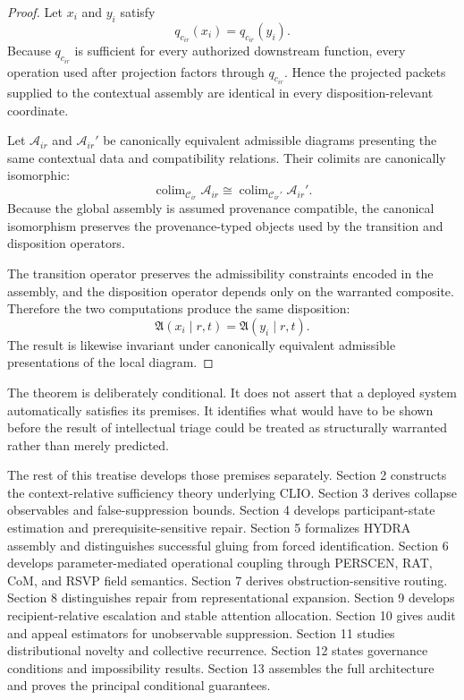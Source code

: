 \documentclass[11pt]{article}
\theoremstyle{definition}
\DeclareMathOperator{\colim}{colim}
\newcommand{\C}{\mathcal{C}}
\newcommand{\A}{\mathcal{A}}
\newcommand{\AC}{\mathfrak{A}}
\begin{document}
\begin{proof}
Let \(x_i\) and \(y_i\) satisfy
\[
q_{c_{ir}}(x_i)
=
q_{c_{ir}}(y_i).
\]
Because \(q_{c_{ir}}\) is sufficient for every authorized downstream function, every operation used after projection factors through \(q_{c_{ir}}\). Hence the projected packets supplied to the contextual assembly are identical in every disposition-relevant coordinate.

Let \(\A_{ir}\) and \(\A_{ir}'\) be canonically equivalent admissible diagrams presenting the same contextual data and compatibility relations. Their colimits are canonically isomorphic:
\[
\colim_{\C_{ir}}\A_{ir}
\cong
\colim_{\C_{ir}'}\A_{ir}'.
\]
Because the global assembly is assumed provenance compatible, the canonical isomorphism preserves the provenance-typed objects used by the transition and disposition operators.

The transition operator preserves the admissibility constraints encoded in the assembly, and the disposition operator depends only on the warranted composite. Therefore the two computations produce the same disposition:
\[
\AC(x_i\mid r,t)
=
\AC(y_i\mid r,t).
\]
The result is likewise invariant under canonically equivalent admissible presentations of the local diagram.
\end{proof}

The theorem is deliberately conditional. It does not assert that a deployed system automatically satisfies its premises. It identifies what would have to be shown before the result of intellectual triage could be treated as structurally warranted rather than merely predicted.

The rest of this treatise develops those premises separately. Section 2 constructs the context-relative sufficiency theory underlying CLIO. Section 3 derives collapse observables and false-suppression bounds. Section 4 develops participant-state estimation and prerequisite-sensitive repair. Section 5 formalizes HYDRA assembly and distinguishes successful gluing from forced identification. Section 6 develops parameter-mediated operational coupling through PERSCEN, RAT, CoM, and RSVP field semantics. Section 7 derives obstruction-sensitive routing. Section 8 distinguishes repair from representational expansion. Section 9 develops recipient-relative escalation and stable attention allocation. Section 10 gives audit and appeal estimators for unobservable suppression. Section 11 studies distributional novelty and collective recurrence. Section 12 states governance conditions and impossibility results. Section 13 assembles the full architecture and proves the principal conditional guarantees.
\end{document}
